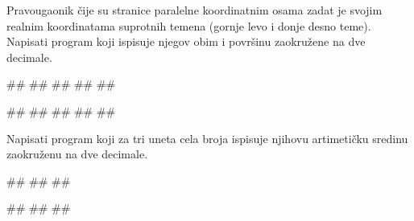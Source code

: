 \begin{Exercise}[label=p1_13] 
Pravougaonik čije su stranice paralelne koordinatnim osama zadat je svojim realnim koordinatama suprotnih temena (gornje levo i donje desno teme). Napisati program koji ispisuje njegov obim i površinu zaokružene na dve decimale. 

\begin{maxitest}
\begin{upotreba}{1}
#\naslovInt#
##
##
##
##
\end{upotreba}
\end{maxitest}

\begin{maxitest}
\begin{upotreba}{2}
#\naslovInt#
##
##
##
##
\end{upotreba}
\end{maxitest}
\end{Exercise}


\begin{Exercise}[label=v1.1_09] 
Napisati program koji za tri uneta cela broja ispisuje njihovu artimetičku sredinu zaokruženu na dve decimale.

\begin{miditest}
\begin{upotreba}{1}
#\naslovInt#
##
##
\end{upotreba}
\end{miditest}
\begin{miditest}
\begin{upotreba}{2}
#\naslovInt#
##
##
\end{upotreba}
\end{miditest}

\end{Exercise}
\begin{Answer}[ref=v1.1_09]
\end{Answer}







